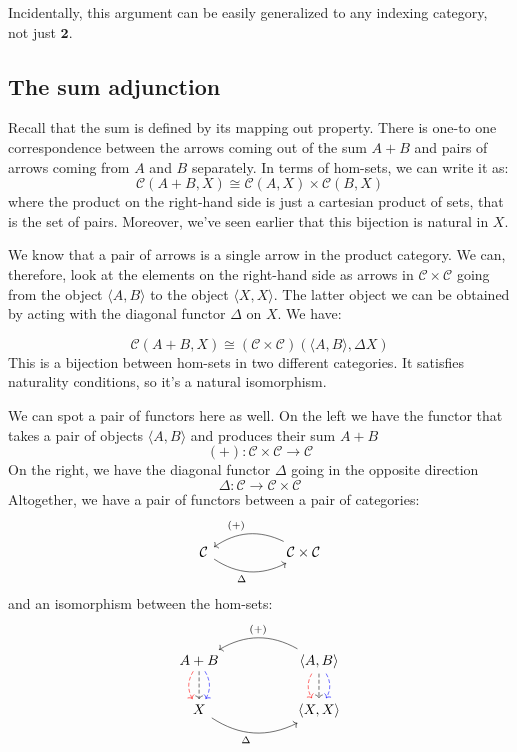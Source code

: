 \documentclass[DaoFP]{subfiles}
\begin{document}
Incidentally, this argument can be easily generalized to any indexing category, not just $\mathbf{2}$.

\subsection{The sum adjunction}

Recall that the sum is defined by its mapping out property. There is one-to one correspondence between the arrows coming out of the sum $A + B$ and pairs of arrows coming from $A$ and $B$ separately. In terms of hom-sets, we can write it as:
\[  \mathcal{C} (A + B, X) \cong \mathcal{C}( A , X) \times \mathcal{C}( B , X)\]
where the product on the right-hand side is just a cartesian product of sets, that is the set of pairs. Moreover, we've seen earlier that this bijection is natural in $X$.

We know that a pair of arrows is a single arrow in the product category. We can, therefore, look at the elements on the right-hand side as arrows in $\mathcal{C} \times \mathcal{C}$ going from the object $\langle A, B \rangle$ to the object $\langle X, X \rangle$. The latter object we can be obtained by acting with the diagonal functor $\Delta$ on $X$. We have:

\[  \mathcal{C} (A + B, X) \cong (\mathcal{C} \times \mathcal{C})( \langle A, B \rangle , \Delta X)\]
This is a bijection between hom-sets in two different categories. It satisfies naturality conditions, so it's a natural isomorphism. 

We can spot a pair of functors here as well. On the left we have the functor that takes a pair of objects $\langle A, B \rangle$ and produces their sum $A + B$
\[ (+) \colon \mathcal{C} \times \mathcal{C} \to \mathcal{C}\]
On the right, we have the diagonal functor $\Delta$ going in the opposite direction
\[ \Delta \colon \mathcal{C} \to  \mathcal{C} \times \mathcal{C} \]
Altogether, we have a pair of functors between a pair of categories:
\[
 \begin{tikzcd}
  \mathcal{C}
   \arrow[rr, bend right, "\Delta"']
  &&
  \mathcal{C} \times \mathcal{C}
 \arrow[ll, bend right, "(+)"']
  \end{tikzcd}
\]
and an isomorphism between the hom-sets:
\[
 \begin{tikzcd}
A + B
\arrow[d, bend right, red, dashed]
\arrow[d, dashed]
\arrow[d, bend left, blue, dashed]
  &&
 \langle A , B \rangle
\arrow[d, bend right, red, dashed]
\arrow[d, dashed]
\arrow[d, bend left, blue, dashed]
 \arrow[ll, bend right, "(+)"']
 \\
 X
   \arrow[rr, bend right, "\Delta"']
 &&
 \langle X, X \rangle
  \end{tikzcd}
\]
\end{document}
